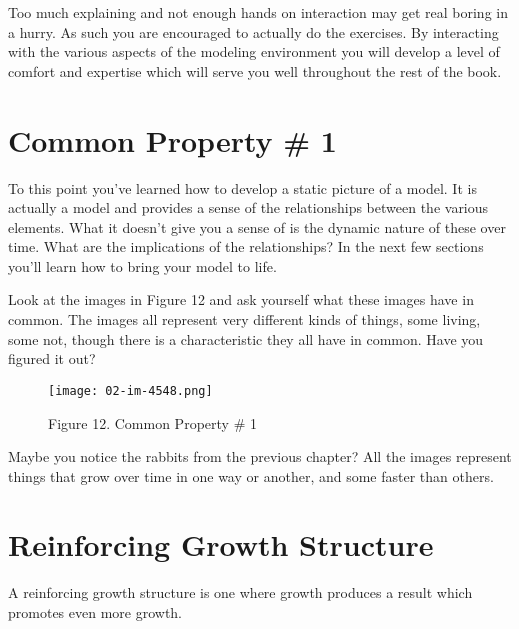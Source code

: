 \documentclass[]{memoir}
\makeatletter
\def\maxwidth{\ifdim\Gin@nat@width>\linewidth\linewidth
\else\Gin@nat@width\fi}
\let\Oldincludegraphics\includegraphics
\renewcommand{\includegraphics}[1]{\Oldincludegraphics[width=\maxwidth]{#1}}
\makeatother
\begin{document}
Too much explaining and not enough hands on interaction may get real
boring in a hurry. As such you are encouraged to actually do the
exercises. By interacting with the various aspects of the modeling
environment you will develop a level of comfort and expertise which will
serve you well throughout the rest of the book.

\section{Common Property \# 1}

To this point you've learned how to develop a static picture of a model.
It is actually a model and provides a sense of the relationships between
the various elements. What it doesn't give you a sense of is the dynamic
nature of these over time. What are the implications of the
relationships? In the next few sections you'll learn how to bring your
model to life.

Look at the images in Figure 12 and ask yourself what these images have
in common. The images all represent very different kinds of things, some
living, some not, though there is a characteristic they all have in
common. Have you figured it out?

\begin{figure}[htbp]
\centering
\texttt{[image: 02-im-4548.png]}
\caption{Figure 12. Common Property \# 1}
\end{figure}

Maybe you notice the rabbits from the previous chapter? All the images
represent things that grow over time in one way or another, and some
faster than others.

\section{Reinforcing Growth Structure}

A reinforcing growth structure is one where growth produces a result
which promotes even more growth.

\FloatBarrier 
\end{document}
